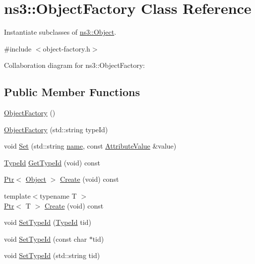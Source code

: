 \hypertarget{classns3_1_1ObjectFactory}{}\section{ns3\+:\+:Object\+Factory Class Reference}
\label{classns3_1_1ObjectFactory}


Instantiate subclasses of \hyperlink{classns3_1_1Object}{ns3\+::\+Object}.  




{\ttfamily \#include $<$object-\/factory.\+h$>$}



Collaboration diagram for ns3\+:\+:Object\+Factory\+:
\subsection*{Public Member Functions}
\begin{DoxyCompactItemize}
\item 
\hyperlink{classns3_1_1ObjectFactory_aa33bb9cd0a190a10239e834383667764}{Object\+Factory} ()
\item 
\hyperlink{classns3_1_1ObjectFactory_ab33a5e24c3393daa01f669b68a448d65}{Object\+Factory} (std\+::string type\+Id)
\item 
void \hyperlink{classns3_1_1ObjectFactory_aef5c0d5019c96bdf01cefd1ff83f4a68}{Set} (std\+::string \hyperlink{generate__test__data__lte__spectrum__model_8m_ab74e6bf80237ddc4109968cedc58c151}{name}, const \hyperlink{classns3_1_1AttributeValue}{Attribute\+Value} \&value)
\item 
\hyperlink{classns3_1_1TypeId}{Type\+Id} \hyperlink{classns3_1_1ObjectFactory_a14baab41e2bd984a3eee543b8d8086d7}{Get\+Type\+Id} (void) const 
\item 
\hyperlink{classns3_1_1Ptr}{Ptr}$<$ \hyperlink{classns3_1_1Object}{Object} $>$ \hyperlink{classns3_1_1ObjectFactory_a18152e93f0a6fe184ed7300cb31e9896}{Create} (void) const 
\item 
{\footnotesize template$<$typename T $>$ }\\\hyperlink{classns3_1_1Ptr}{Ptr}$<$ T $>$ \hyperlink{classns3_1_1ObjectFactory_a87f49a6ba741eaf6314b827ee46e9fb0}{Create} (void) const 
\end{DoxyCompactItemize}
{\bf }\par
\begin{DoxyCompactItemize}
\item 
void \hyperlink{classns3_1_1ObjectFactory_a77dcd099064038a1eb7a6b8251229ec3}{Set\+Type\+Id} (\hyperlink{classns3_1_1TypeId}{Type\+Id} tid)
\item 
void \hyperlink{classns3_1_1ObjectFactory_a18dc654db27aa0885075cd468f62679b}{Set\+Type\+Id} (const char $\ast$tid)
\item 
void \hyperlink{classns3_1_1ObjectFactory_affafbb7457b9b2614f57858126e576b1}{Set\+Type\+Id} (std\+::string tid)
\end{DoxyCompactItemize}

